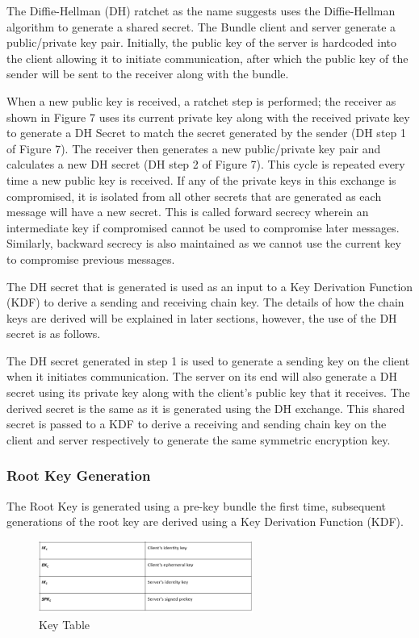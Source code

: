 The Diffie-Hellman (DH) ratchet as the name suggests uses the Diffie-Hellman algorithm to generate a shared secret. The Bundle client and server generate a public/private key pair. Initially, the public key of the server is hardcoded into the client allowing it to initiate communication, after which the public key of the sender will be sent to the receiver along with the bundle.

When a new public key is received, a ratchet step is performed; the receiver as shown in Figure 7 uses its current private key along with the received private key to generate a DH Secret to match the secret generated by the sender (DH step 1 of Figure 7). The receiver then generates a new public/private key pair and calculates a new DH secret (DH step 2 of Figure 7). This cycle is repeated every time a new public key is received.
If any of the private keys in this exchange is compromised, it is isolated from all other secrets that are generated as each message will have a new secret. This is called forward secrecy wherein an intermediate key if compromised cannot be used to compromise later messages. Similarly, backward secrecy is also maintained as we cannot use the current key to compromise previous messages.

The DH secret that is generated is used as an input to a Key Derivation Function (KDF) to derive a sending and receiving chain key. The details of how the chain keys are derived will be explained in later sections, however, the use of the DH secret is as follows.

The DH secret generated in step 1 is used to generate a sending key on the client when it initiates communication. The server on its end will also generate a DH secret using its private key along with the client’s public key that it receives. The derived secret is the same as it is generated using the DH exchange. This shared secret is passed to a KDF to derive a receiving and sending chain key on the client and server respectively to generate the same symmetric encryption key.

\subsubsection{Root Key Generation}
The Root Key is generated using a pre-key bundle the first time, subsequent generations of the root key are derived using a Key Derivation Function (KDF).

\begin{figure}[ht!]
\centering
\includegraphics[width= 70mm]{./images/Key Table.png}
\caption{Key Table}
\end{figure}


